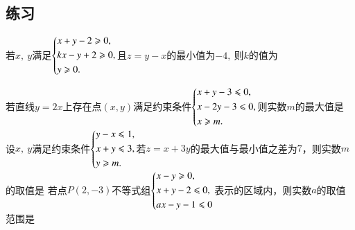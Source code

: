 \documentclass{BHCexam}
\begin{document}
\subsection{练习}
\begin{questions}
\qs 若$ x,~y $满足$\begin{dcases}
x+y-2\ge 0,\\
kx-y+2\ge 0,\\
y\ge 0.
\end{dcases}$且$ z=y-x $的最小值为$ -4,~ $则$ k $的值为\xx
{}

\qs 若直线$ y=2x $上存在点$ (x,y) $满足约束条件$\begin{dcases}
x+y-3\le0,\\
x-2y-3\le0,\\
x\ge m.
\end{dcases}$则实数$ m $的最大值是\xx
{}
\qs 设$x,~y$满足约束条件$\begin{dcases}
y-x\le1,\\
x+y\le3,\\
y\ge m.
\end{dcases}$若$ z=x+3y $的最大值与最小值之差为$ 7 $，则实数$ m $的取值是\xx
{}
	\qs 若点$ P\left(2,-3\right) $不等式组$\begin{dcases}
		x-y\ge 0,\\
		x+y-2\le 0,\\
		ax-y-1\le 0
	\end{dcases}$表示的区域内，则实数$ a $的取值范围是\xx



\end{questions}
\end{document}
